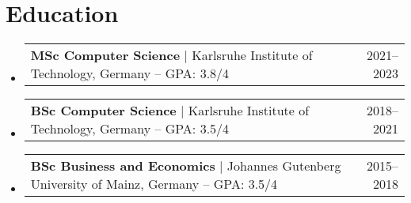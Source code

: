 \documentclass[letterpaper,11pt]{article}
\makeatletter
\newcommand{\resumeSubheading}[4]{
  \vspace{-2pt}\item
    \begin{tabular*}{0.97\textwidth}[t]{l@{\extracolsep{\fill}}r}
      \textbf{#1} & #2 \\
      \textit{\small#3} & \textit{\small #4} \\
    \end{tabular*}\vspace{-7pt}
}
\newcommand{\resumeProjectHeading}[2]{
    \item
    \begin{tabular*}{0.97\textwidth}{l@{\extracolsep{\fill}}r}
      \small#1 & #2 \\
    \end{tabular*}\vspace{-7pt}
}
\newcommand{\resumeSubHeadingListStart}{\begin{itemize}[leftmargin=0.15in, label={}]}
\newcommand{\resumeSubHeadingListEnd}{\end{itemize}}
\makeatother
\begin{document}





\section{Education}
\resumeSubHeadingListStart

\resumeProjectHeading
{\textbf{MSc Computer Science} \space $|$ \space Karlsruhe Institute of Technology, Germany -- GPA: 3.8/4}{2021--2023}

\resumeProjectHeading
{\textbf{BSc Computer Science} \space $|$ \space Karlsruhe Institute of Technology, Germany -- GPA: 3.5/4}{2018--2021}

\resumeProjectHeading
{\textbf{BSc Business and Economics} \space $|$ \space Johannes Gutenberg University of Mainz, Germany -- GPA: 3.5/4}{2015--2018}

\resumeSubHeadingListEnd




\end{document}
